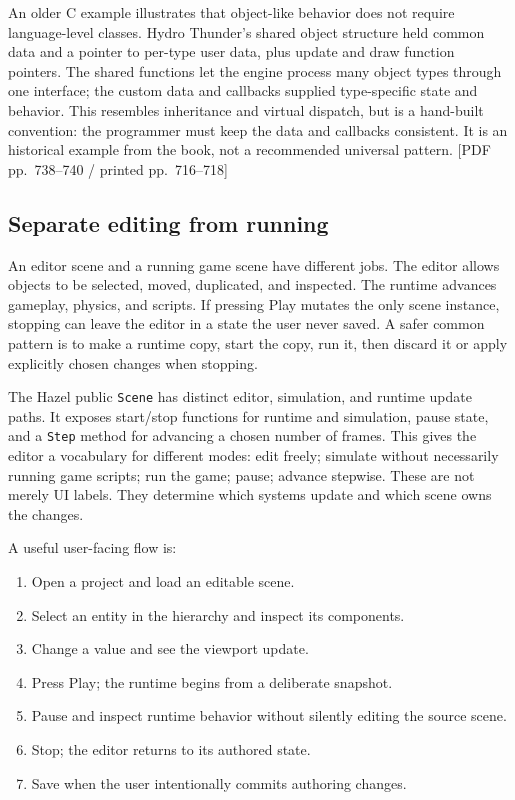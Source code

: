 An older C example illustrates that object-like behavior does not require language-level classes. Hydro Thunder's shared object structure held common data and a pointer to per-type user data, plus update and draw function pointers. The shared functions let the engine process many object types through one interface; the custom data and callbacks supplied type-specific state and behavior. This resembles inheritance and virtual dispatch, but is a hand-built convention: the programmer must keep the data and callbacks consistent. It is an historical example from the book, not a recommended universal pattern. {[}PDF pp.~738--740 / printed pp.~716--718{]}

\subsection{Separate editing from running}\label{06-engine-ii-ch032-separate-editing-from-running}

An editor scene and a running game scene have different jobs. The editor allows objects to be selected, moved, duplicated, and inspected. The runtime advances gameplay, physics, and scripts. If pressing Play mutates the only scene instance, stopping can leave the editor in a state the user never saved. A safer common pattern is to make a runtime copy, start the copy, run it, then discard it or apply explicitly chosen changes when stopping.

The Hazel public \texttt{Scene} has distinct editor, simulation, and runtime update paths. It exposes start/stop functions for runtime and simulation, pause state, and a \texttt{Step} method for advancing a chosen number of frames. This gives the editor a vocabulary for different modes: edit freely; simulate without necessarily running game scripts; run the game; pause; advance stepwise. These are not merely UI labels. They determine which systems update and which scene owns the changes.

A useful user-facing flow is:

\begin{enumerate}
\def\labelenumi{\arabic{enumi}.}
\tightlist
\item
  Open a project and load an editable scene.
\item
  Select an entity in the hierarchy and inspect its components.
\item
  Change a value and see the viewport update.
\item
  Press Play; the runtime begins from a deliberate snapshot.
\item
  Pause and inspect runtime behavior without silently editing the source scene.
\item
  Stop; the editor returns to its authored state.
\item
  Save when the user intentionally commits authoring changes.
\end{enumerate}

